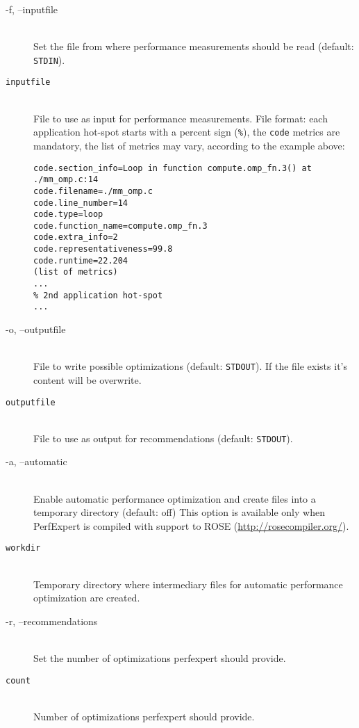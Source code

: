 \begin{description}
	\item[\btt -f, --inputfile]\hfill \\
	Set the file from where performance measurements should be read (default: \texttt{STDIN}).

	\item[\tt inputfile]\hfill \\
	File to use as input for performance measurements. File format: each application hot-spot starts with a percent sign (\texttt{\%}), the \texttt{code} metrics are mandatory, the list of metrics may vary, according to the example above:
	\begin{lstlisting}[breaklines]
% 1st application hot-spot
code.section_info=Loop in function compute.omp_fn.3() at ./mm_omp.c:14
code.filename=./mm_omp.c
code.line_number=14
code.type=loop
code.function_name=compute.omp_fn.3
code.extra_info=2
code.representativeness=99.8
code.runtime=22.204
(list of metrics)
...
% 2nd application hot-spot
...
	\end{lstlisting}
	\item[\btt -o, --outputfile]\hfill \\
	File to write possible optimizations (default: \texttt{STDOUT}). If the file exists it's content will be overwrite.

	\item[\tt outputfile]\hfill \\
	File to use as output for recommendations (default: \texttt{STDOUT}).

	\item[\btt -a, --automatic]\hfill \\
	Enable automatic performance optimization and create files into a temporary directory (default: off) This option is available only when PerfExpert is compiled with support to ROSE (\url{http://rosecompiler.org/}).

	\item[\tt workdir]\hfill \\
	Temporary directory where intermediary files for automatic performance optimization are created.

	\item[\btt -r, --recommendations]\hfill \\
	Set the number of optimizations perfexpert should provide.

	\item[\tt count]\hfill \\
	Number of optimizations perfexpert should provide.


\end{description}
